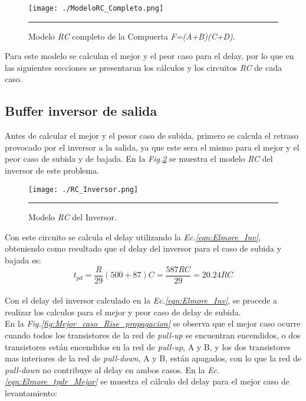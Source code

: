 \documentclass[12pt,a4paper]{article} %
\begin{document}
\begin{figure}[htbp]
  \centering
    \texttt{[image: ./ModeloRC\_Completo.png]}
    \rule{35em}{0.5pt}
  \caption[IdealvsSim]{Modelo \textit{RC} completo de la Compuerta \textit{F=(A+B)(C+D)}.}
  \label{fig:ModeloRC_Completo}
\end{figure}

Para este modelo se calculan el mejor y el peor caso para el delay, por lo que en las siguientes secciones se presentaran los cálculos y los circuitos \textit{RC} de cada caso.\\

\subsection{Buffer inversor de salida}

Antes de calcular el mejor y el pesor caso de subida, primero se calcula el retraso provocado por el inversor a la salida, ya que este sera el mismo para el mejor y el peor caso de subida y de bajada. En la \textit{Fig.\ref{fig:RC_Inversor}} se muestra el modelo \textit{RC} del inversor de este problema.\\

\begin{figure}[htbp]
  \centering
    \texttt{[image: ./RC\_Inversor.png]}
    \rule{35em}{0.5pt}
  \caption[IdealvsSim]{Modelo \textit{RC} del Inversor.}
  \label{fig:RC_Inversor}
\end{figure}

Con este circuito se calcula el delay utilizando la \textit{Ec.\ref{eqn:Elmore_Inv}}, obteniendo como resultado que el delay del inversor para el caso de subida y bajada es:\\

\begin{equation}\label{eqn:Elmore_Inv}
t_{pd} = \frac{R}{29}(500 + 87)C = \frac{587RC}{29} = 20.24RC
\end{equation}\\

Con el delay del inversor calculado en la \textit{Ec.\ref{eqn:Elmore_Inv}}, se procede a realizar los calculos para el mejor y peor caso de delay de subida.\\

En la \textit{Fig.\ref{fig:Mejor_caso_Rise_propagacion}} se observa que el mejor caso ocurre cuando todos los transistores de la red de \textit{pull-up} se encuentran encendidos, o dos transistores están encendidos en la red de \textit{pull-up}, A y B, y los dos transistores mas interiores de la red de \textit{pull-down}, A y B, están apagados, con lo que la red de \textit{pull-down} no contribuye al delay en ambos casos. En la \textit{Ec.\ref{eqn:Elmore_tpdr_Mejor}} se muestra el cálculo del delay para el mejor caso de levantamiento:\\
\end{document}
